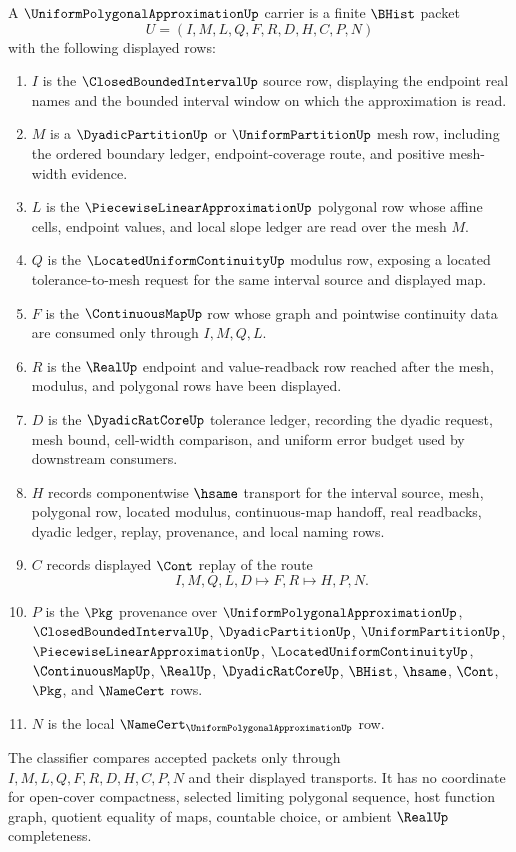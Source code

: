 \begin{definition}
\label{def:uniform-polygonal-approximation-carrier}
A $\UniformPolygonalApproximationUp$ carrier is a finite $\BHist$ packet
$$
U=(I,M,L,Q,F,R,D,H,C,P,N)
$$
with the following displayed rows:
\begin{enumerate}
\item $I$ is the $\ClosedBoundedIntervalUp$ source row, displaying the endpoint real names and the bounded interval window on which the approximation is read.
\item $M$ is a $\DyadicPartitionUp$ or $\UniformPartitionUp$ mesh row, including the ordered boundary ledger, endpoint-coverage route, and positive mesh-width evidence.
\item $L$ is the $\PiecewiseLinearApproximationUp$ polygonal row whose affine cells, endpoint values, and local slope ledger are read over the mesh $M$.
\item $Q$ is the $\LocatedUniformContinuityUp$ modulus row, exposing a located tolerance-to-mesh request for the same interval source and displayed map.
\item $F$ is the $\ContinuousMapUp$ row whose graph and pointwise continuity data are consumed only through $I,M,Q,L$.
\item $R$ is the $\RealUp$ endpoint and value-readback row reached after the mesh, modulus, and polygonal rows have been displayed.
\item $D$ is the $\DyadicRatCoreUp$ tolerance ledger, recording the dyadic request, mesh bound, cell-width comparison, and uniform error budget used by downstream consumers.
\item $H$ records componentwise $\hsame$ transport for the interval source, mesh, polygonal row, located modulus, continuous-map handoff, real readbacks, dyadic ledger, replay, provenance, and local naming rows.
\item $C$ records displayed $\Cont$ replay of the route
$$
I,M,Q,L,D \longmapsto F,R \longmapsto H,P,N .
$$
\item $P$ is the $\Pkg$ provenance over $\UniformPolygonalApproximationUp$, $\ClosedBoundedIntervalUp$, $\DyadicPartitionUp$, $\UniformPartitionUp$, $\PiecewiseLinearApproximationUp$, $\LocatedUniformContinuityUp$, $\ContinuousMapUp$, $\RealUp$, $\DyadicRatCoreUp$, $\BHist$, $\hsame$, $\Cont$, $\Pkg$, and $\NameCert$ rows.
\item $N$ is the local $\NameCert_{\UniformPolygonalApproximationUp}$ row.
\end{enumerate}
The classifier compares accepted packets only through $I,M,L,Q,F,R,D,H,C,P,N$ and their displayed transports. It has no coordinate for open-cover compactness, selected limiting polygonal sequence, host function graph, quotient equality of maps, countable choice, or ambient $\RealUp$ completeness.
\end{definition}

